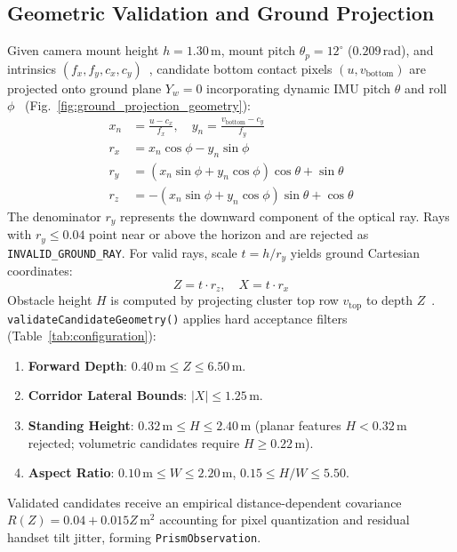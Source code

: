 

\subsection{Geometric Validation and Ground Projection}
\label{sec:impl_geometry}
Given camera mount height $h = 1.30$\,m, mount pitch $\theta_p = 12^\circ$ ($0.209$\,rad), and intrinsics $(f_x, f_y, c_x, c_y)$~\cite{zhang2000flexible,hartley2003multiple}, candidate bottom contact pixels $(u, v_{\text{bottom}})$ are projected onto ground plane $Y_w = 0$ incorporating dynamic IMU pitch $\theta$ and roll $\phi$~\cite{criminisi2000single,cathey2005perspective} (Fig.~\ref{fig:ground_projection_geometry}):
\begin{align}
x_n &= \frac{u - c_x}{f_x}, \quad y_n = \frac{v_{\text{bottom}} - c_y}{f_y} \\
r_x &= x_n \cos\phi - y_n \sin\phi \label{eq:rx} \\
r_y &= (x_n \sin\phi + y_n \cos\phi) \cos\theta + \sin\theta \label{eq:ry} \\
r_z &= -(x_n \sin\phi + y_n \cos\phi) \sin\theta + \cos\theta \label{eq:rz}
\end{align}
The denominator $r_y$ represents the downward component of the optical ray. Rays with $r_y \le 0.04$ point near or above the horizon and are rejected as \texttt{INVALID\_GROUND\_RAY}. For valid rays, scale $t = h / r_y$ yields ground Cartesian coordinates:
\begin{equation}
Z = t \cdot r_z, \quad X = t \cdot r_x
\label{eq:metric_coords}
\end{equation}
Obstacle height $H$ is computed by projecting cluster top row $v_{\text{top}}$ to depth $Z$~\cite{hoiem2007recovering}. \texttt{validateCandidateGeometry()} applies hard acceptance filters (Table~\ref{tab:configuration}):
\begin{enumerate}
    \item \textbf{Forward Depth}: $0.40\,\text{m} \le Z \le 6.50\,\text{m}$.
    \item \textbf{Corridor Lateral Bounds}: $|X| \le 1.25\,\text{m}$.
    \item \textbf{Standing Height}: $0.32\,\text{m} \le H \le 2.40\,\text{m}$ (planar features $H < 0.32$\,m rejected; volumetric candidates require $H \ge 0.22$\,m).
    \item \textbf{Aspect Ratio}: $0.10\,\text{m} \le W \le 2.20\,\text{m}$, $0.15 \le H/W \le 5.50$.
\end{enumerate}
Validated candidates receive an empirical distance-dependent covariance $R(Z) = 0.04 + 0.015 Z$\,m$^2$ accounting for pixel quantization and residual handset tilt jitter, forming \texttt{PrismObservation}.


